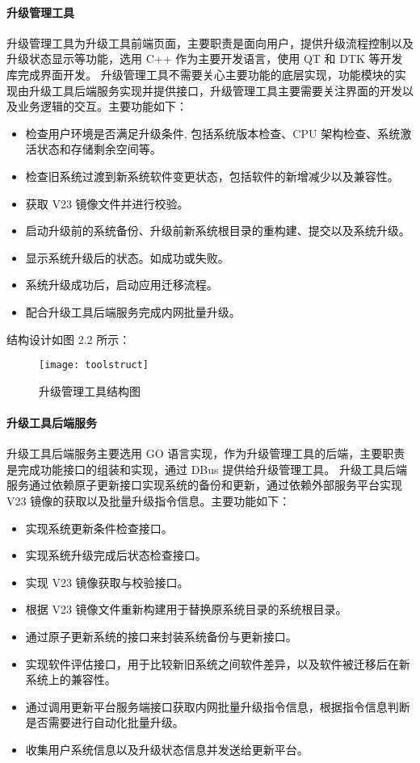 \documentclass{utart}
\begin{document}
\paragraph{升级管理工具}
升级管理工具为升级工具前端页面，主要职责是面向用户，提供升级流程控制以及升级状态显示等功能，选用 C++ 作为主要开发语言，使用 QT 和 DTK 等开发库完成界面开发。
升级管理工具不需要关心主要功能的底层实现，功能模块的实现由升级工具后端服务实现并提供接口，升级管理工具主要需要关注界面的开发以及业务逻辑的交互。主要功能如下：
\begin{itemize}
    \item 检查用户环境是否满足升级条件, 包括系统版本检查、CPU 架构检查、系统激活状态和存储剩余空间等。
    \item 检查旧系统过渡到新系统软件变更状态，包括软件的新增减少以及兼容性。
    \item 获取 V23 镜像文件并进行校验。
    \item 启动升级前的系统备份、升级前新系统根目录的重构建、提交以及系统升级。
    \item 显示系统升级后的状态。如成功或失败。
    \item 系统升级成功后，启动应用迁移流程。
    \item 配合升级工具后端服务完成内网批量升级。
\end{itemize}
结构设计如图 2.2 所示：
\begin{figure}[H]
    \centering
    \texttt{[image: toolstruct]}
    \caption{升级管理工具结构图}
    \label{fig:toolstruct}
\end{figure}

\paragraph{升级工具后端服务}
升级工具后端服务主要选用 GO 语言实现，作为升级管理工具的后端，主要职责是完成功能接口的组装和实现，通过 DBus 提供给升级管理工具。
升级工具后端服务通过依赖原子更新接口实现系统的备份和更新，通过依赖外部服务平台实现 V23 镜像的获取以及批量升级指令信息。主要功能如下：
\begin{itemize}
    \item 实现系统更新条件检查接口。
    \item 实现系统升级完成后状态检查接口。
    \item 实现 V23 镜像获取与校验接口。
    \item 根据 V23 镜像文件重新构建用于替换原系统目录的系统根目录。
    \item 通过原子更新系统的接口来封装系统备份与更新接口。
    \item 实现软件评估接口，用于比较新旧系统之间软件差异，以及软件被迁移后在新系统上的兼容性。
    \item 通过调用更新平台服务端接口获取内网批量升级指令信息，根据指令信息判断是否需要进行自动化批量升级。
    \item 收集用户系统信息以及升级状态信息并发送给更新平台。
\end{itemize}
\end{document}
